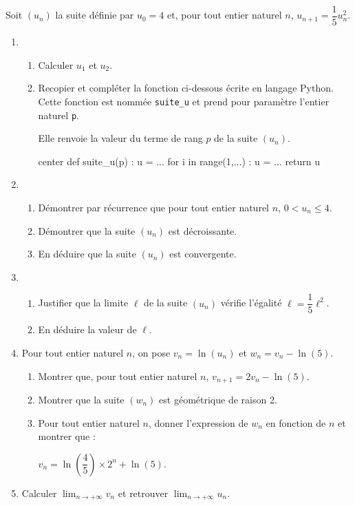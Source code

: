 Soit $\left(u_n\right)$ la suite définie par $u_0 = 4$ et, pour tout entier naturel $n$, $u_{n+1} = \dfrac15 u_n^2$.

\begin{enumerate}
	\item 
	\begin{enumerate}
		\item Calculer $u_1$ et $u_2$.
		\item Recopier et compléter la fonction ci-dessous écrite en langage \textsf{Python}.
		Cette fonction est nommée \texttt{suite\_u} et prend pour paramètre l'entier naturel \texttt{p}.
		
		Elle renvoie la valeur du terme de rang $p$ de la suite $\left(u_n\right)$.

\begin{CodePythonLstAlt}[Largeur=8cm]{center}
def suite_u(p) :
	u = ...
	for i in range(1,...) :
		u = ...
	return u
\end{CodePythonLstAlt}
	\end{enumerate}
	\item 
	\begin{enumerate}
		\item Démontrer par récurrence que pour tout entier naturel $n$, $0 < u_n \leqslant 4$.
		\item Démontrer que la suite $\left(u_n\right)$ est décroissante.
		\item En déduire que la suite $\left(u_n\right)$ est convergente.
	\end{enumerate}
	\item 
	\begin{enumerate}
		\item Justifier que la limite $\ell$ de la suite $\left(u_n\right)$ vérifie l'égalité $\ell = \dfrac15 \ell^2$.
		\item En déduire la valeur de $\ell$.
	\end{enumerate}
	\item Pour tout entier naturel $n$, on pose $v_n = \ln \left(u_n\right)$ et $w_n = v_n - \ln (5)$.
	\begin{enumerate}
		\item Montrer que, pour tout entier naturel $n$, $v_{n+1} = 2v_n - \ln (5)$.
		\item Montrer que la suite $\left(w_n\right)$ est géométrique de raison 2.
		\item Pour tout entier naturel $n$, donner l'expression de $w_n$ en fonction de $n$ et montrer que :
		
		\hfill$v_n = \ln \left(\dfrac45 \right) \times 2^n + \ln (5)$.\hfill~
	\end{enumerate}
	\item Calculer $\displaystyle\lim_{n \to + \infty} v_n$ et retrouver $\displaystyle\lim_{n \to + \infty} u_n$.
\end{enumerate}


